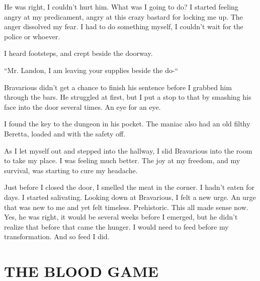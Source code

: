 He was right, I couldn't hurt him. What was I going to do? I
started feeling angry at my predicament, angry at this crazy
bastard for locking me up. The anger dissolved my fear. I had to do
something myself, I couldn't wait for the police or
whoever.



I heard footsteps, and crept beside the doorway.



``Mr. Landon, I am leaving your supplies beside the
do-``



Bravarious didn't get a chance to finish his sentence before
I grabbed him through the bars. He struggled at first, but I put a
stop to that by smashing his face into the door several times. An
eye for an eye.



I found the key to the dungeon in his pocket. The maniac also had
an old filthy Beretta, loaded and with the safety off.



As I let myself out and stepped into the hallway, I slid Bravarious
into the room to take my place. I was feeling much better. The joy
at my freedom, and my survival, was starting to cure my
headache.



Just before I closed the door, I smelled the meat in the corner. I
hadn't eaten for days. I started salivating. Looking down at
Bravarious, I felt a new urge. An urge that was new to me and yet
felt timeless. Prehistoric. This all made sense now. Yes, he was
right, it would be several weeks before I emerged, but he
didn't realize that before that came the hunger. I would need
to feed before my transformation. And so feed I did. 

 



%
%
%
%
%
%
%
% 
%
%
%

\chapter{THE BLOOD GAME}

